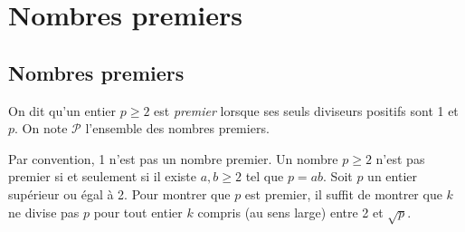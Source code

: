 \documentclass{magnolia}
\begin{document}


\section{Nombres premiers}
\subsection{Nombres premiers}

\begin{definition}
On dit qu'un entier $p\geq 2$ est \emph{premier} lorsque ses seuls diviseurs
positifs sont 1 et $p$. On note $\mathcal{P}$ l'ensemble des nombres premiers.
\end{definition}

\begin{remarques}
\remarque Par convention, 1 n'est pas un nombre premier.
\remarque Un nombre $p\geq 2$ n'est pas premier si et seulement si il existe $a,b\geq 2$ tel que $p=ab$.
\remarque Soit $p$ un entier supérieur ou égal à 2. Pour montrer que $p$ est
  premier, il suffit de montrer que $k$ ne divise pas $p$ pour tout entier
  $k$ compris (au sens large) entre 2 et $\sqrt{p}$.
\end{remarques}
\end{document}
